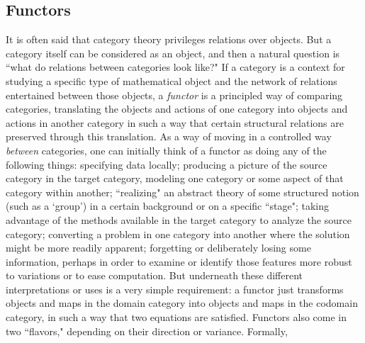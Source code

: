 \documentclass[11pt]{book}
\theoremstyle{definition}
\theoremstyle{definition}
\theoremstyle{definition}
\theoremstyle{theorem}
\theoremstyle{definition}
\begin{document}
	\subsection{Functors}
	It is often said that category theory privileges relations over objects. But a category itself can be considered as an object, and then a natural question is ``what do relations between categories look like?" If a category is a context for studying a specific type of mathematical object and the network of relations entertained between those objects, a \textit{functor} is a principled way of comparing categories, translating the objects and actions of one category into objects and actions in another category in such a way that certain structural relations are preserved through this translation. As a way of moving in a controlled way \textit{between} categories, one can initially think of a functor as doing any of the following things: specifying data locally; producing a picture of the source category in the target category, modeling one category or some aspect of that category within another; ``realizing" an abstract theory of some structured notion (such as a `group') in a certain background or on a specific ``stage"; taking advantage of the methods available in the target category to analyze the source category; converting a problem in one category into another where the solution might be more readily apparent; forgetting or deliberately losing some information, perhaps in order to examine or identify those features more robust to variations or to ease computation. But underneath these different interpretations or uses is a very simple requirement: a functor just transforms objects and maps in the domain category into objects and maps in the codomain category, in such a way that two equations are satisfied. Functors also come in two ``flavors," depending on their direction or variance. Formally, 
\end{document}
